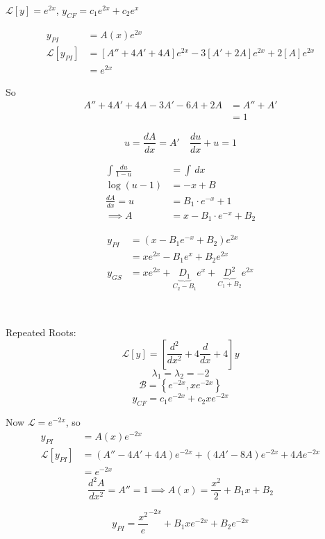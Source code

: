 \documentclass[twoside]{scrartcl}
\begin{document}
\begin{example}
$\mathcal{L}[y] = e^{2x}$, $y_{CF} = c_1e^{2x} +c_2e^{x}$

\[
\begin{aligned}
  y_{PI} &= A(x)e^{2x}\\
  \mathcal{L}[y_{PI}] &= [A'' + 4A' + 4A]e^{2x} -3[A'+2A]e^{2x} + 2[A]e^{2x}\\
  &= e^{2x}
\end{aligned}
\]

So 
\[
\begin{aligned}
  A'' + 4A' + 4A - 3A' - 6A + 2A &= A'' + A'\\
  &= 1
\end{aligned}
\]

\[u = \dfrac{dA}{dx}= A' \quad \frac{du}{dx} + u = 1\]


\[
\begin{aligned}
  \int \frac{du}{1-u} &= \int \,dx\\
  \log(u-1) &= -x + B\\
  \frac{dA}{dx} = u &= B_1\cdot e^{-x} + 1\\
  \implies A &= x -B_1\cdot e^{-x} + B_2
\end{aligned}
\]


\[
\begin{aligned}
  y_{PI} &= (x-B_1e^{-x} + B_2)e^{2x}\\
  &= xe^{2x} -B_1e^{x} + B_2e^{2x}\\
  y_{GS} &= xe^{2x} + \underbrace{D_1}_{C_2-B_1}e^{x} + \underbrace{D^2}_{C_1+B_2}e^{2x}
\end{aligned}
\]
\end{example}~

\begin{example}
Repeated Roots: 
\[\mathcal{L}[y] = \left[\frac{d^2}{dx^2} + 4\frac{d}{dx} + 4\right]y\]	
\[\lambda_1 = \lambda_2 = -2\]
\[\mathcal{B} = \left\{e^{-2x},xe^{-2x}\right\}\]
\[y_{CF} = c_1e^{-2x} + c_2xe^{-2x}\]

Now $\mathcal{L} = e^{-2x}$, so 
\[
\begin{aligned}
  y_{PI} &= A(x)e^{-2x}\\
  \mathcal{L}[y_{PI}] &= (A'' - 4A' + 4A)e^{-2x} + (4A' - 8A)e^{-2x} + 4Ae^{-2x}\\ 
  &= e^{-2x}
\end{aligned}
\]
\[\frac{d^2A}{dx^2} = A'' = 1 \implies A(x) = \frac{x^2}{2} + B_1x + B_2\]

\[y_{PI} = \frac{x^2}e^{-2x} + B_1xe^{-2x} + B_2e^{-2x}\]
\end{example}
\end{document}
